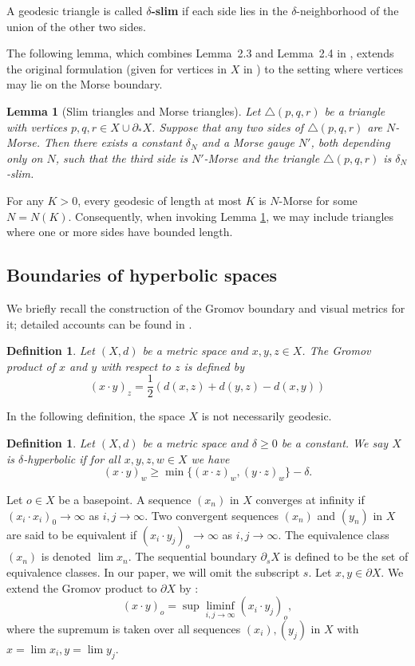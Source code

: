 \documentclass[a4paper,11pt,oneside]{article}
\newtheorem{Definition}[Theorem]{Definition}
\newtheorem{Lemma}[Theorem]{Lemma}
\begin{document}
    
A geodesic triangle is called \textbf{$\delta$-slim} if each side lies in the $\delta$-neighborhood of the union of the other two sides.

The following lemma, which combines Lemma~2.3 and Lemma~2.4 in \cite{CharneyCordesMurray19}, extends the original formulation (given for vertices in $X$ in \cite{Cordes17}) to the setting where vertices may lie on the Morse boundary.  
 
\begin{Lemma}[Slim triangles and Morse triangles]\label{slim-M}
Let $\triangle(p, q, r)$ be a triangle with vertices $p, q, r\in X\cup\partial_*X$. Suppose that any two sides of $\triangle(p,q,r)$ are $N$-Morse. Then there exists a constant $\delta_N$ and a Morse gauge $N'$, both depending only on $N$, such that the third side is $N'$-Morse and the triangle $\triangle(p,q,r)$ is $\delta_N$-slim.
\end{Lemma}
    
For any $K>0$, every geodesic of length at most $K$ is $N$-Morse for some $N=N(K)$. Consequently, when invoking Lemma \ref{slim-M}, we may include triangles where one or more sides have bounded length.

\subsection{Boundaries of hyperbolic spaces}
We briefly recall the construction of the Gromov boundary and visual metrics for it; detailed accounts can be found in \cite{BridsonHaefliger99, Ghys90}.

\begin{Definition}
    Let $(X, d)$ be a metric space and $x, y,z\in X$. The Gromov product of $x$ and $y$ with respect to $z$ is defined by 
    $$(x\cdot y)_z=\frac{1}{2}(d(x,z)+d(y,z)-d(x,y))$$
\end{Definition}

  In the following definition, the space $X$ is not necessarily geodesic.

\begin{Definition}\label{GHyper}
    Let $(X,d)$ be a metric space and $\delta\ge0$ be a constant. We say $X$ is $\delta$-hyperbolic if for all $x,y,z,w\in X$ we have 
    $$(x\cdot y)_w\ge \min\{(x\cdot z)_w, (y\cdot z)_w \}-\delta.$$
\end{Definition}

Let $o\in X$ be a basepoint. A sequence $(x_n)$ in $X$ converges at infinity if $(x_i\cdot x_i)_0\to \infty$ as $i,j\to \infty$. Two convergent sequences $(x_n)$ and $(y_n)$ in $X$ are said to be equivalent if $(x_i\cdot y_j)_o\to \infty$ as $i,j\to \infty$. The equivalence class $(x_n)$ is denoted $\lim x_n$. The sequential boundary $\partial_sX$ is defined to be the set of equivalence classes. In our paper, we will omit the subscript $s$. 
Let $x,y\in \partial X$. We extend the Gromov product to $\partial X$ by :
$$
(x\cdot y)_o=\sup\displaystyle{\liminf_{i,j\to\infty}}(x_i\cdot y_j)_o,
$$
where the supremum is taken over all sequences $(x_i), (y_j)$ in $X$ with $x=\lim x_i,y=\lim y_j.$
\end{document}
